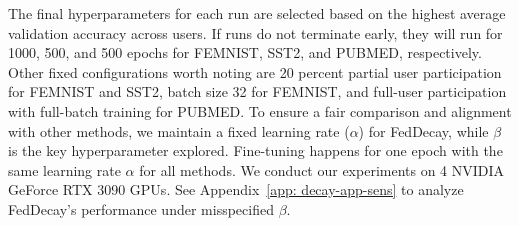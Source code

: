 The final hyperparameters for each run are selected based on the highest average validation accuracy across users.
If runs do not terminate early, they will run for 1000, 500, and 500 epochs for FEMNIST, SST2, and PUBMED, respectively.
Other fixed configurations worth noting are 20 percent partial user participation for FEMNIST and SST2, batch size 32 for FEMNIST, and full-user participation with full-batch training for PUBMED.
To ensure a fair comparison and alignment with other methods, we maintain a fixed learning rate ($\alpha$) for FedDecay, while $\beta$ is the key hyperparameter explored.
Fine-tuning happens for one epoch with the same learning rate $\alpha$ for all methods. 
We conduct our experiments on 4 NVIDIA GeForce RTX 3090 GPUs.
See Appendix~\ref{app: decay-app-sens} to analyze FedDecay's performance under misspecified $\beta$. 